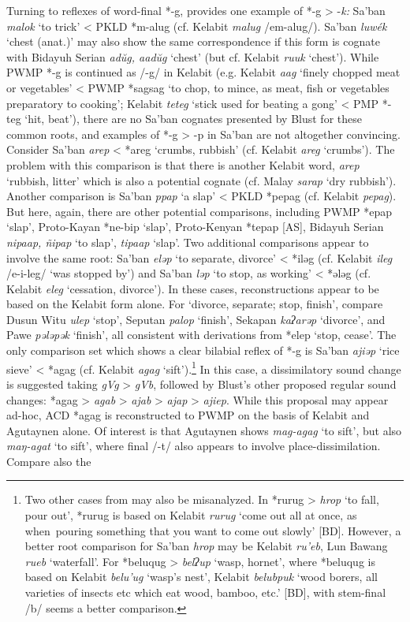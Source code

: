 \documentclass[output=paper]{langscibook}
\begin{document}
Turning to reflexes of word-final *-g, \citet{Blust2005} provides one example of *-g > -\textit{k:} Sa’ban \textit{malok} ‘to trick’ < PKLD *m-alug (cf. Kelabit \textit{malug} \mbox{/em-alug/}). Sa’ban \textit{luwék} ‘chest (anat.)’ may also show the same correspondence if this form is cognate with Bidayuh Serian \textit{adŭg, aadŭg} ‘chest’ (but cf. Kelabit \textit{ruuk} ‘chest’). While PWMP *-g is continued as \mbox{/-g/} in Kelabit (e.g. Kelabit \textit{aag} ‘finely chopped meat or vegetables’ < PWMP *sagsag ‘to chop, to mince, as meat, fish or vegetables preparatory to cooking’; Kelabit \textit{teteg} ‘stick used for beating a gong’ < PMP *-teg ‘hit, beat’), there are no Sa’ban cognates presented by Blust for these common roots, and examples of *-g > -{p} in Sa’ban are not altogether convincing. Consider Sa’ban \textit{arep} < *areg ‘crumbs, rubbish’ (cf. Kelabit \textit{areg} ‘crumbs’). The problem with this comparison is that there is another Kelabit word, \textit{arep} ‘rubbish, litter’ which is also a potential cognate (cf. Malay \textit{sarap} ‘dry rubbish’). Another comparison is Sa’ban \textit{ppap} ‘a slap’ < PKLD *pepag (cf. Kelabit \textit{pepag}). But here, again, there are other potential comparisons, including PWMP *epap ‘slap’, Proto-Kayan *ne-bip ‘slap’, Proto-Kenyan *tepap [AS], Bidayuh Serian \textit{nipaap, ñipap} ‘to slap’, \textit{tipaap} ‘slap’. Two additional comparisons appear to involve the same root: Sa’ban \textit{eləp} ‘to separate, divorce’ < *iləg (cf. Kelabit \textit{ileg} \mbox{/e-i-leg/} ‘was stopped by’) and Sa’ban \textit{ləp} ‘to stop, as working’ < *ələg (cf. Kelabit \textit{eleg} ‘cessation, divorce’). In these cases, reconstructions appear to be based on the Kelabit form alone. For ‘divorce, separate; stop, finish’, compare Dusun Witu \textit{ulep} ‘stop’, Seputan \textit{palop} ‘finish’, Sekapan \textit{kaʔarəp} ‘divorce’, and Pawe \textit{pələpək} ‘finish’, all consistent with derivations from *elep ‘stop, cease’. The only comparison set which shows a clear bilabial reflex of *-g is Sa’ban \textit{ajiəp} ‘rice sieve’ < *agag (cf. Kelabit \textit{agag} ‘sift’).\footnote{Two other cases from \citet[256]{Blust2005} may also be misanalyzed. In *rurug > \textit{hrop} ‘to fall, pour out’, *rurug is based on Kelabit \textit{rurug} ‘come out all at once, as when~pouring something that you want to come out slowly’ [BD]. However, a better root comparison for Sa’ban \textit{hrop} may be Kelabit \textit{ru’eb}, Lun Bawang \textit{rueb} ‘waterfall’. For *beluqug > \textit{belʔup} ‘wasp, hornet’, where *beluqug is based on Kelabit \textit{belu’ug} ‘wasp’s nest’, Kelabit \textit{belubpuk} ‘wood borers, all varieties of insects etc which eat wood, bamboo, etc.’ [BD], with stem-final \mbox{/b/} seems a better comparison.} In this case, a dissimilatory sound change is suggested taking \textit{gVg} > \textit{gVb}, followed by Blust’s other proposed regular sound changes: *agag > \textit{agab} > \textit{ajab} > \textit{ajap} > \textit{ajiep}. While this proposal may appear ad-hoc, ACD *agag is reconstructed to PWMP on the basis of Kelabit and Agutaynen alone. Of interest is that Agutaynen shows \textit{mag-agag} ‘to sift’, but also \textit{maŋ-agat} ‘to sift’, where final \mbox{/-t/} also appears to involve place-dissimilation. Compare also the 
\end{document}
